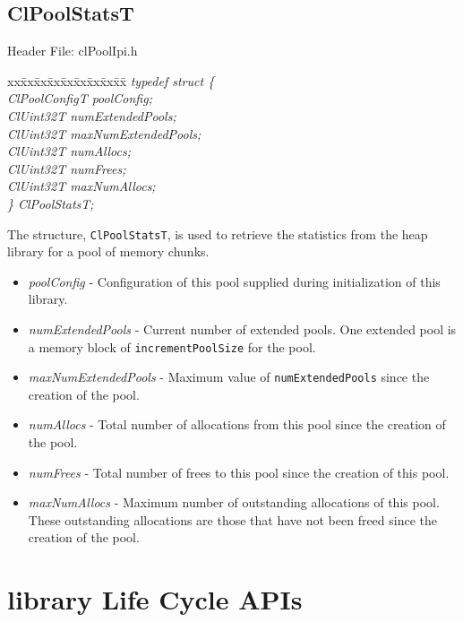 \begin{flushleft}
\subsection{ClPoolStatsT}
\begin{Desc}
\item[Header File:]clPoolIpi.h\end{Desc}
\begin{tabbing}
xx\=xx\=xx\=xx\=xx\=xx\=xx\=xx\=xx\=\kill
\textit{typedef struct \{}\\
\>\>\>\>\textit{ClPoolConfigT   poolConfig;}\\
\>\>\>\>\textit{ClUint32T   numExtendedPools;}\\
\>\>\>\>\textit{ClUint32T   maxNumExtendedPools;}\\
\>\>\>\>\textit{ClUint32T   numAllocs;}\\
\>\>\>\>\textit{ClUint32T   numFrees;}\\
\>\>\>\>\textit{ClUint32T   maxNumAllocs;}\\
\textit{\} ClPoolStatsT;}
\end{tabbing} The structure, {\tt{ClPoolStatsT}}, is used to retrieve the statistics from the
heap library for a pool of memory chunks.
\begin{itemize}
\item \textit{poolConfig} - Configuration of this pool supplied during initialization of this library.
\item \textit{numExtendedPools} - Current number of extended pools. 
One extended pool is a memory block of {\tt{incrementPoolSize}} for the pool.
\item \textit{maxNumExtendedPools} - Maximum value of {\tt{numExtendedPools}} since the creation of the pool.
\item \textit{numAllocs} - Total number of allocations from this pool since the creation of the pool.
\item \textit{numFrees} - Total number of frees to this pool since the creation of this pool.
\item \textit{maxNumAllocs} - Maximum number of outstanding allocations of this pool. These outstanding allocations are those that have not been freed
since the creation of the pool.
\end{itemize}





\newpage

\section{library Life Cycle APIs}

\end{flushleft}
